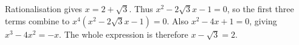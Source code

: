 Rationalisation gives $x=2+\sqrt3$. Thus $x^2-2\sqrt3x-1=0$, so the first three terms combine to $x^4(x^2-2\sqrt3x-1)=0$. Also $x^2-4x+1=0$, giving $x^3-4x^2=-x$. The whole expression is therefore $x-\sqrt3=\boxed2$.
